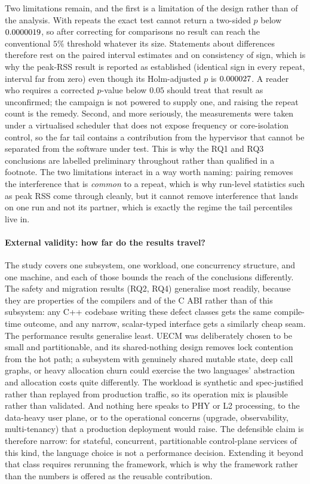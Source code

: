 \documentclass[english,twoside,openright,a4paper,censored,csm,software-track-2020]{HYthesisML}
\begin{document}
Two limitations remain, and the first is a limitation of the design rather than of the
analysis. With \NRepeats{} repeats the exact test cannot return a two-sided $p$ below
$0.0000019$, so after correcting for \NTests{} comparisons no result can reach the
conventional $5\%$ threshold whatever its size. Statements about differences therefore rest on
the paired interval estimates and on consistency of sign, which is why the peak-RSS result is
reported as established (identical sign in every repeat, interval far from zero) even though
its Holm-adjusted $p$ is $0.000027$. A reader who requires a corrected $p$-value below
$0.05$ should treat that result as unconfirmed; the campaign is not powered to supply one, and
raising the repeat count is the remedy. Second, and more seriously, the measurements were taken
under a virtualised scheduler that does not expose frequency or core-isolation control, so the
far tail contains a contribution from the hypervisor that cannot be separated from the software
under test. This is why the RQ1 and RQ3 conclusions are labelled preliminary throughout rather
than qualified in a footnote. The two limitations interact in a way worth naming: pairing
removes the interference that is \emph{common} to a repeat, which is why run-level statistics
such as peak RSS come through cleanly, but it cannot remove interference that lands on one run
and not its partner, which is exactly the regime the tail percentiles live in.

\paragraph{External validity: how far do the results travel?}
The study covers one subsystem, one workload, one concurrency structure, and one machine, and
each of those bounds the reach of the conclusions differently. The safety and migration
results (RQ2, RQ4) generalise most readily, because they are properties of the compilers and
of the C ABI rather than of this subsystem: any C++ codebase writing these defect classes gets
the same compile-time outcome, and any narrow, scalar-typed interface gets a similarly cheap
seam. The performance results generalise least. UECM was deliberately chosen to be small and
partitionable, and its shared-nothing design removes lock contention from the hot path;
a subsystem with genuinely shared mutable state, deep call graphs, or heavy allocation
churn could exercise the two languages' abstraction and allocation costs quite differently. The
workload is synthetic and spec-justified rather than replayed from production traffic, so its
operation mix is plausible rather than validated. And nothing here speaks to PHY or L2
processing, to the data-heavy user plane, or to the operational concerns (upgrade,
observability, multi-tenancy) that a production deployment would raise. The defensible claim
is therefore narrow: for stateful, concurrent, partitionable control-plane services of this
kind, the language choice is not a performance decision. Extending it beyond that class
requires rerunning the framework, which is why the framework rather than the numbers is
offered as the reusable contribution.
\end{document}
